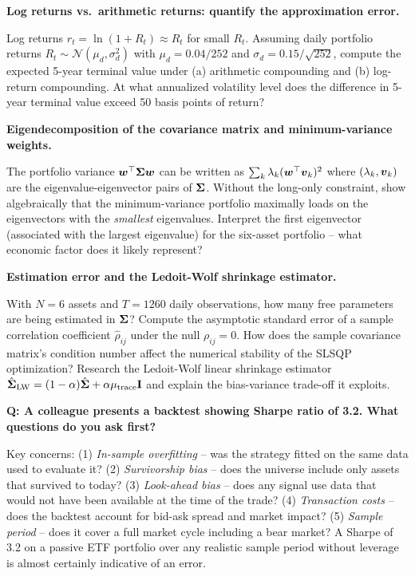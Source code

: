 \begin{challengebox}
  \textbf{Log returns vs.\ arithmetic returns: quantify the approximation error.}

  Log returns $r_t = \ln(1 + R_t) \approx R_t$ for small $R_t$. Assuming daily portfolio returns $R_t \sim \mathcal{N}(\mu_d, \sigma_d^2)$ with $\mu_d = 0.04/252$ and $\sigma_d = 0.15/\sqrt{252}$, compute the expected 5-year terminal value under (a) arithmetic compounding and (b) log-return compounding. At what annualized volatility level does the difference in 5-year terminal value exceed 50 basis points of return?
\end{challengebox}

\begin{challengebox}
  \textbf{Eigendecomposition of the covariance matrix and minimum-variance weights.}

  The portfolio variance $\boldsymbol{w}^{\top}\mathbf{\Sigma}\boldsymbol{w}$ can be written as $\sum_k \lambda_k (\boldsymbol{w}^{\top}\boldsymbol{v}_k)^2$ where $(\lambda_k, \boldsymbol{v}_k)$ are the eigenvalue-eigenvector pairs of $\mathbf{\Sigma}$. Without the long-only constraint, show algebraically that the minimum-variance portfolio maximally loads on the eigenvectors with the \emph{smallest} eigenvalues. Interpret the first eigenvector (associated with the largest eigenvalue) for the six-asset portfolio -- what economic factor does it likely represent?
\end{challengebox}

\begin{challengebox}
  \textbf{Estimation error and the Ledoit-Wolf shrinkage estimator.}

  With $N = 6$ assets and $T = 1260$ daily observations, how many free parameters are being estimated in $\mathbf{\Sigma}$? Compute the asymptotic standard error of a sample correlation coefficient $\hat{\rho}_{ij}$ under the null $\rho_{ij} = 0$. How does the sample covariance matrix's condition number affect the numerical stability of the SLSQP optimization? Research the Ledoit-Wolf linear shrinkage estimator $\hat{\mathbf{\Sigma}}_{\text{LW}} = (1-\alpha)\hat{\mathbf{\Sigma}} + \alpha \mu_{\text{trace}}\mathbf{I}$ and explain the bias-variance trade-off it exploits.
\end{challengebox}

\begin{interviewbox}
  \textbf{Q: A colleague presents a backtest showing Sharpe ratio of 3.2. What questions do you ask first?}

  Key concerns: (1) \textit{In-sample overfitting} -- was the strategy fitted on the same data used to evaluate it? (2) \textit{Survivorship bias} -- does the universe include only assets that survived to today? (3) \textit{Look-ahead bias} -- does any signal use data that would not have been available at the time of the trade? (4) \textit{Transaction costs} -- does the backtest account for bid-ask spread and market impact? (5) \textit{Sample period} -- does it cover a full market cycle including a bear market? A Sharpe of 3.2 on a passive ETF portfolio over any realistic sample period without leverage is almost certainly indicative of an error.
\end{interviewbox}

